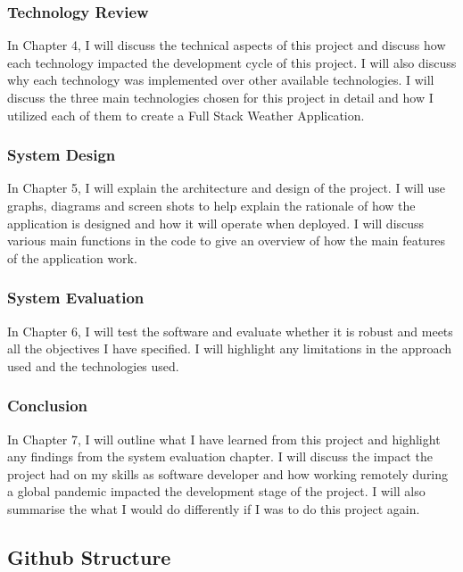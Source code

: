 \subsubsection{Technology Review}
In Chapter 4, I will discuss the technical aspects of this project and discuss how each technology impacted the development cycle of this project. I will also discuss why each technology was implemented over other available technologies. I will discuss the three main technologies chosen for this project in detail and how I utilized each of them to create a Full Stack Weather Application. 

\subsubsection{System Design}
In Chapter 5, I will explain the architecture and design of the project. I will use graphs, diagrams and screen shots to help explain the rationale of how the application is designed and how it will operate when deployed. I will discuss various main functions in the code to give an overview of how the main features of the application work.

\subsubsection{System Evaluation}
In Chapter 6, I will test the software and evaluate whether it is robust and meets all the objectives I have specified. I will highlight any limitations in the approach used and the technologies used.

\subsubsection{Conclusion}
In Chapter 7, I will outline what I have learned from this project and highlight any findings from the system evaluation chapter. I will discuss the impact the project had on my skills as software developer and how working remotely during a global pandemic impacted the development stage of the project. I will also summarise the what I would do differently if I was to do this project again.

\subsection{Github Structure}


